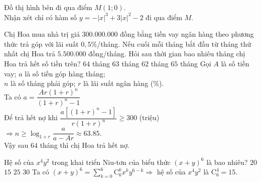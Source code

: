 \begin{ex}%
{}
	\loigiai
	{
	Đồ thị hình bên đi qua điểm $ M(1;0) $.\\
	Nhận xét chỉ có hàm số $ y = -|x|^3 + 3 |x|^2 - 2 $ đi qua điểm $ M $.
	}
\end{ex}
\begin{ex}%
Chị Hoa mua nhà trị giá $ 300.000.000 $ đồng bằng tiền vay ngân hàng theo phương thức trả góp với lãi suất $ 0,5 \% $/tháng. Nếu cuối mỗi tháng bắt đầu từ tháng thứ nhất chị Hoa trả $ 5.500.000 $ đồng/tháng. Hỏi sau thời gian bao nhiêu tháng chị Hoa trả hết số tiền trên?
\choice
{\True $ 64  $ tháng}
{ $ 63  $ tháng}
{$ 62  $ tháng}
{$ 65  $ tháng}
	\loigiai
	{Gọi $ A $ là số tiền vay; $ a $ là số tiền góp hàng tháng;\\ $ n $ là số tháng phải góp; $ r $ là lãi suất ngân hàng (\%). \\
Ta có $ a = \dfrac{Ar(1+r)^n}{(1+r)^n -1} $\\
Để trả hết nợ khi $ \dfrac{a \left[(1+r)^n - 1\right]}{r(1+r)^n} \ge 300$ (triệu)
$ \Rightarrow n \geq \log_{1+r} \dfrac{a}{a-Ar} \approx 63.85$.\\
Vậy sau $ 64 $ tháng thì chị Hoa trả hết nợ.	}
\end{ex}
\begin{ex}%
Hệ số của $ x^4 y^2 $ trong khai triển Niu-tơn của biểu thức $ (x+y)^6 $ là bao nhiêu?
	\choice
	{$ 20 $}	
	{\True $ 15 $}
	{$ 25 $}
	{$ 30 $}
	\loigiai
	{
Ta có $ (x+y)^6 = \displaystyle \sum\limits_{k=0}^ 6 \mathrm{C}_6^k x^k y^{6-k} \Rightarrow  $ hệ số của $ x^4y^2 $ là $ \mathrm{C}_6^4 = 15. $
	}
\end{ex}
